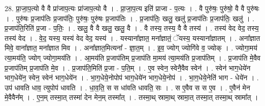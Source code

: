 \documentclass[17pt]{extarticle}
\begin{document}
28. प्रा॒जा॒प॒त्यो वै वै प्रा॑जाप॒त्यः प्रा॑जाप॒त्यो वै । . प्रा॒जा॒प॒त्य इति॑ प्राजा - प॒त्यः । . वै पुरु॑षः॒ पुरु॑षो॒ वै वै पुरु॑षः । . पुरु॑षः प्र॒जाप॑तिः प्र॒जाप॑तिः॒ पुरु॑षः॒ पुरु॑षः प्र॒जाप॑तिः । . प्र॒जाप॑तिः॒ खलु॒ खलु॑ प्र॒जाप॑तिः प्र॒जाप॑तिः॒ खलु॑ । . प्र॒जाप॑ति॒रिति॑ प्र॒जा - प॒तिः॒ । . खलु॒ वै वै खलु॒ खलु॒ वै । . वै तस्य॒ तस्य॒ वै वै तस्य॑ । . तस्य॑ वेद वेद॒ तस्य॒ तस्य॑ वेद । . वे॒द॒ यस्य॒ यस्य॑ वेद वेद॒ यस्य॑ । . यस्याना᳚ज्ञात॒ मना᳚ज्ञातं॒ ॅयस्य॒ यस्याना᳚ज्ञातम् । . अना᳚ज्ञात मिवे॒ वाना᳚ज्ञात॒ मना᳚ज्ञात मिव । . अना᳚ज्ञात॒मित्यना᳚ - ज्ञा॒त॒म् । . इ॒व॒ ज्योग् ज्योगि॑वे व॒ ज्योक् । . ज्योगा॒मय॑ त्या॒मय॑ति॒ ज्योग् ज्योगा॒मय॑ति । . आ॒मय॑ति प्र॒जाप॑तिम् प्र॒जाप॑ति मा॒मय॑ त्या॒मय॑ति प्र॒जाप॑तिम् । . प्र॒जाप॑ति मे॒वैव प्र॒जाप॑तिम् प्र॒जाप॑ति मे॒व । . प्र॒जाप॑ति॒मिति॑ प्र॒जा - प॒ति॒म् । . ए॒व स्वेन॒ स्वेनै॒वैव स्वेन॑ । . स्वेन॑ भाग॒धेये॑न भाग॒धेये॑न॒ स्वेन॒ स्वेन॑ भाग॒धेये॑न । . भा॒ग॒धेये॒नोपोप॑ भाग॒धेये॑न भाग॒धेये॒नोप॑ । . भा॒ग॒धेये॒नेति॑ भाग - धेये॑न । . उप॑ धावति धाव॒ त्युपोप॑ धावति । . धा॒व॒ति॒ स स धा॑वति धावति॒ सः । . स ए॒वैव स स ए॒व । . ए॒वैन॑ मेन मे॒वैवैन᳚म् । . ए॒न॒म् तस्मा॒त् तस्मा॑ देन मेन॒म् तस्मा᳚त् । . तस्मा॒थ् स्रामा॒थ् स्रामा॒त् तस्मा॒त् तस्मा॒थ् स्रामा᳚त् । \newline
\end{document}
